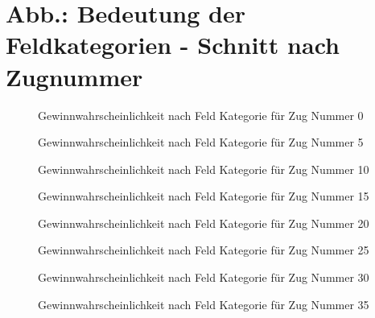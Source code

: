 \section*{Abb.: Bedeutung der Feldkategorien - Schnitt nach Zugnummer}

\begin{figure}[ht]
\centering
{}
\caption{Gewinnwahrscheinlichkeit nach Feld Kategorie für Zug Nummer 0}
\label{fig:win-pro-turn-0}
\end{figure}
\begin{figure}[ht]
\centering
{}
\caption{Gewinnwahrscheinlichkeit nach Feld Kategorie für Zug Nummer 5}
\label{fig:win-pro-turn-5}
\end{figure}
\begin{figure}[ht]
\centering
{}
\caption{Gewinnwahrscheinlichkeit nach Feld Kategorie für Zug Nummer 10}
\label{fig:win-pro-turn-10}
\end{figure}
\begin{figure}[ht]
\centering
{}
\caption{Gewinnwahrscheinlichkeit nach Feld Kategorie für Zug Nummer 15}
\label{fig:win-pro-turn-15}
\end{figure}
\begin{figure}[ht]
\centering
{}
\caption{Gewinnwahrscheinlichkeit nach Feld Kategorie für Zug Nummer 20}
\label{fig:win-pro-turn-20}
\end{figure}
\begin{figure}[ht]
\centering
{}
\caption{Gewinnwahrscheinlichkeit nach Feld Kategorie für Zug Nummer 25}
\label{fig:win-pro-turn-25}
\end{figure}
\begin{figure}[ht]
\centering
{}
\caption{Gewinnwahrscheinlichkeit nach Feld Kategorie für Zug Nummer 30}
\label{fig:win-pro-turn-30}
\end{figure}
\begin{figure}[ht]
\centering
{}
\caption{Gewinnwahrscheinlichkeit nach Feld Kategorie für Zug Nummer 35}
\label{fig:win-pro-turn-35}
\end{figure}

